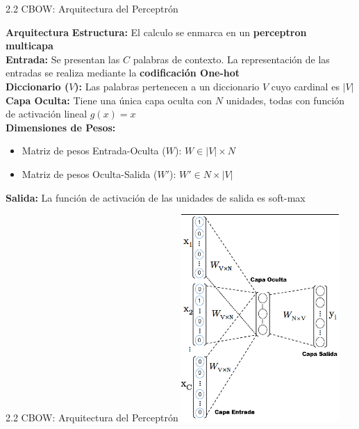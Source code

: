 \documentclass{beamer}
\begin{document}
\begin{frame}[fragile]{2.2 CBOW: Arquitectura del Perceptrón}
	\begin{block}{\textbf{Arquitectura}}
		\justifying
		\vspace{0.1cm}
		\textbf{Estructura:} El calculo se enmarca en un \textbf{perceptron multicapa}\\
		\vspace{0.1cm}
		\textbf{Entrada:} Se presentan las $C$ palabras de contexto. La representación de las entradas se realiza mediante la \textbf{codificación One-hot}\\
		\vspace{0.1cm}
		\textbf{Diccionario ($V$):} Las palabras pertenecen a un diccionario $V$ cuyo cardinal es $|V|$ \\
		\vspace{0.1cm}
		\textbf{Capa Oculta:} Tiene una única capa oculta con $N$ unidades, todas con función de activación lineal $g(x) = x$ \\
		\vspace{0.1cm}
		\textbf{Dimensiones de Pesos:} 						\\
		\begin{itemize}
			\item Matriz de pesos Entrada-Oculta ($W$): $W \in |V| \times N$\\
			\item Matriz de pesos Oculta-Salida ($W'$): $W' \in N \times |V|$
		\end{itemize}
		\vspace{0.1cm}
		\textbf{Salida:} La función de activación de las unidades de salida es soft-max 
	\end{block}
	
\end{frame}
	
	
\begin{frame}[fragile]{2.2 CBOW: Arquitectura del Perceptrón}
\centering
\includegraphics[width=0.45\textwidth]{CBOW_arquitectura}
	
\end{frame}
\end{document}
